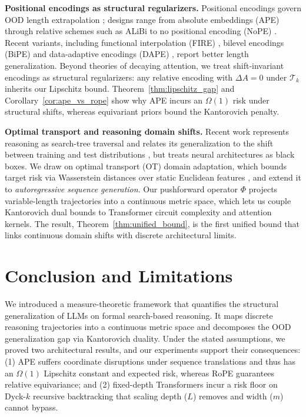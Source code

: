 \documentclass{article}
\begin{document}
\textbf{Positional encodings as structural regularizers.} 
Positional encodings govern OOD length extrapolation \citep{zhao2024lengthextrapolationtransformerssurvey}; designs range from absolute embeddings (APE) through relative schemes such as ALiBi \citep{press2022trainshorttestlong} to no positional encoding (NoPE) \citep{kazemnejad2023impactpositionalencodinglength}. Recent variants, including functional interpolation (FIRE) \citep{li2024functionalinterpolationrelativepositions}, bilevel encodings (BiPE) \citep{he2024stoneshitbirdbilevel} and data-adaptive encodings (DAPE) \citep{zheng2024dapedataadaptivepositionalencoding}, report better length generalization. Beyond theories of decaying attention, we treat shift-invariant encodings as structural regularizers: any relative encoding with $\Delta A = 0$ under $\mathcal{T}_k$ inherits our Lipschitz bound. Theorem~\ref{thm:lipschitz_gap} and Corollary~\ref{cor:ape_vs_rope} show why APE incurs an $\Omega(1)$ risk under structural shifts, whereas equivariant priors bound the Kantorovich penalty.

\textbf{Optimal transport and reasoning domain shifts.} 
Recent work represents reasoning as search-tree traversal \citep{gandhi2024streamsearchsoslearning} and relates its generalization to the shift between training and test distributions \citep{prystawski2023thinkstepstepreasoning, zhao2026chainofthoughtreasoningllmsmirage}, but treats neural architectures as black boxes. We draw on optimal transport (OT) domain adaptation, which bounds target risk via Wasserstein distances over static Euclidean features \citep{courty2016optimaltransportdomainadaptation, redko2017theoreticalanalysisdomainadaptation}, and extend it to \textit{autoregressive sequence generation}. Our pushforward operator $\Phi$ projects variable-length trajectories into a continuous metric space, which lets us couple Kantorovich dual bounds to Transformer circuit complexity and attention kernels. The result, Theorem~\ref{thm:unified_bound}, is the first unified bound that links continuous domain shifts with discrete architectural limits.

\section{Conclusion and Limitations}
\label{sec:conclusion}

We introduced a measure-theoretic framework that quantifies the structural generalization of LLMs on formal search-based reasoning.
It maps discrete reasoning trajectories into a continuous metric space and decomposes the OOD generalization gap via Kantorovich duality. Under the stated assumptions, we proved two architectural results, and our experiments support their consequences: (1) APE suffers coordinate disruptions under sequence translations and thus has an $\Omega(1)$ Lipschitz constant and expected risk, whereas RoPE guarantees relative equivariance; and (2) fixed-depth Transformers incur a risk floor on Dyck-$k$ recursive backtracking that scaling depth ($L$) removes and width ($m$) cannot bypass. 
\end{document}
